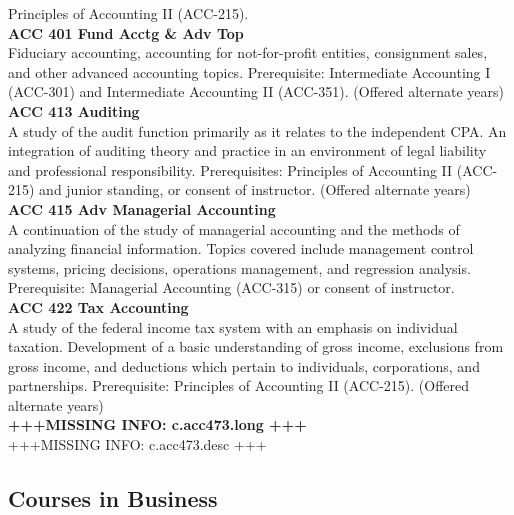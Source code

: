 \documentclass[
  letterpaper,
]{scrbook}
\begin{document}
Principles of Accounting II (ACC-215).\\
\textbf{ACC 401 Fund Acctg \& Adv Top}\\
Fiduciary accounting, accounting for not-for-profit entities,
consignment sales, and other advanced accounting topics. Prerequisite:
Intermediate Accounting I (ACC-301) and Intermediate Accounting II
(ACC-351). (Offered alternate years)\\
\textbf{ACC 413 Auditing}\\
A study of the audit function primarily as it relates to the independent
CPA. An integration of auditing theory and practice in an environment of
legal liability and professional responsibility. Prerequisites:
Principles of Accounting II (ACC-215) and junior standing, or consent of
instructor. (Offered alternate years)\\
\textbf{ACC 415 Adv Managerial Accounting}\\
A continuation of the study of managerial accounting and the methods of
analyzing financial information. Topics covered include management
control systems, pricing decisions, operations management, and
regression analysis. Prerequisite: Managerial Accounting (ACC-315) or
consent of instructor.\\
\textbf{ACC 422 Tax Accounting}\\
A study of the federal income tax system with an emphasis on individual
taxation. Development of a basic understanding of gross income,
exclusions from gross income, and deductions which pertain to
individuals, corporations, and partnerships. Prerequisite: Principles of
Accounting II (ACC-215). (Offered alternate years)\\
\textbf{+++MISSING INFO: c.acc473.long +++}\\
+++MISSING INFO: c.acc473.desc +++

\subsection{Courses in Business}\label{courses-in-business}
\end{document}

